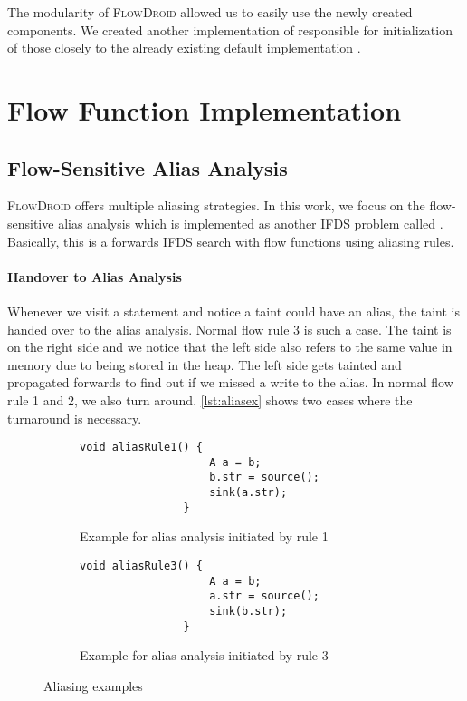 \documentclass[../draft.tex]{subfiles}
\begin{document}
    The modularity of \textsc{FlowDroid} allowed us to easily use the newly created components. We created another implementation of  responsible for initialization of those closely to the already existing default implementation .

    \section{Flow Function Implementation}\label{s:problems}

    \subsection{Flow-Sensitive Alias Analysis}\label{s:aliasing}
    \textsc{FlowDroid} offers multiple aliasing strategies.
    In this work, we focus on the flow-sensitive alias analysis which is implemented as another IFDS problem called . Basically, this is a forwards IFDS search with flow functions using aliasing rules. 

    \paragraph{Handover to Alias Analysis}
    Whenever we visit a statement and notice a taint could have an alias, the taint is handed over to the alias analysis. 
    Normal flow rule 3 is such a case. The taint is on the right side and we notice that the left side also refers to the same value in memory due to being stored in the heap. The left side gets tainted and propagated forwards to find out if we missed a write to the alias.
    In normal flow rule 1 and 2, we also turn around. \autoref{lst:aliasex} shows two cases where the turnaround is necessary.

    \begin{figure}[ht]
        \centering
        \begin{subfigure}[b]{0.45\textwidth}
            \centering
            \begin{lstlisting}[gobble=16]
                void aliasRule1() {
                    A a = b;
                    b.str = source();
                    sink(a.str);
                }
            \end{lstlisting}
            \caption{Example for alias analysis initiated by rule 1}
        \end{subfigure}
        \hfill
        \begin{subfigure}[b]{0.45\textwidth}
            \centering
            \begin{lstlisting}[gobble=16]
                void aliasRule3() {
                    A a = b;
                    a.str = source();
                    sink(b.str);
                }
            \end{lstlisting}
            \caption{Example for alias analysis initiated by rule 3}
        \end{subfigure}
        \caption{Aliasing examples}
        \label{lst:aliasex}
    \end{figure}
\end{document}
